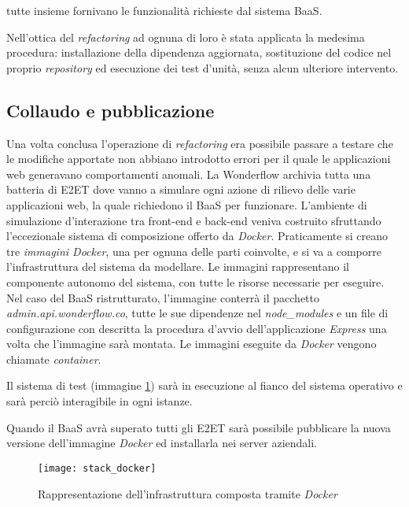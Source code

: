 tutte insieme fornivano le funzionalità richieste dal sistema \gls{BaaS}.

Nell'ottica del \textit{refactoring} ad ognuna di loro è stata applicata la
medesima procedura: installazione della dipendenza aggiornata, sostituzione del
codice nel proprio \textit{repository} ed esecuzione dei test d'unità, senza
alcun ulteriore intervento.

\subsection{Collaudo e pubblicazione}
Una volta conclusa l'operazione di \textit{refactoring} era possibile passare
a testare che le modifiche apportate non abbiano introdotto errori per il quale
le applicazioni web generavano comportamenti anomali. La Wonderflow archivia
tutta una batteria di \gls{E2ET} dove vanno a simulare ogni azione di rilievo
delle varie applicazioni web, la quale richiedono il \gls{BaaS} per funzionare.
L'ambiente di simulazione d'interazione tra \gls{front-end} e \gls{back-end}
veniva costruito sfruttando l'eccezionale sistema di composizione offerto da
\textit{Docker}. Praticamente si creano tre \textit{immagini Docker}, una per
ognuna delle parti coinvolte, e si va a comporre l'infrastruttura del sistema
da modellare. Le immagini rappresentano il componente autonomo del sistema, con
tutte le risorse necessarie per eseguire. Nel caso del \gls{BaaS} ristrutturato,
l'immagine conterrà il pacchetto \textit{admin.api.wonderflow.co}, tutte le
sue dipendenze nel \textit{node\_modules} e un file di configurazione con
descritta la procedura d'avvio dell'applicazione \textit{Express} una volta
che l'immagine sarà montata. Le immagini eseguite da \textit{Docker} vengono
chiamate \textit{container}.

Il sistema di test (immagine \ref{fig:stack_docker}) sarà in esecuzione al
fianco del sistema operativo e sarà perciò interagibile in ogni istanze.

Quando il \gls{BaaS} avrà superato tutti gli \gls{E2ET} sarà possibile
pubblicare la nuova versione dell'immagine \textit{Docker} ed installarla nei
server aziendali.

\begin{figure}[H]
\begin{center}
\texttt{[image: stack\_docker]}
\caption{
Rappresentazione dell'infrastruttura composta tramite \textit{Docker}
}
\label{fig:stack_docker}
\end{center}
\end{figure}

